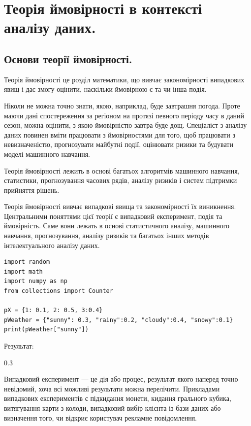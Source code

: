 \chapter{Теорія ймовірності в контексті аналізу даних.}


\section{Основи теорії ймовірності.}

Теорія ймовірності це розділ математики, що вивчає закономірності випадкових явищ і дає змогу оцінити, наскільки ймовірною є та чи інша подія. 

Ніколи не можна точно знати, якою, наприклад, буде завтрашня погода. Проте маючи дані спостереження за регіоном на протязі певного періоду часу в даний сезон, можна оцінити, з якою ймовірністю завтра буде дощ. Спеціаліст з аналізу даних повинен вміти працювати з ймовірностями для того, щоб працювати з невизначеністю, прогнозувати майбутні події, оцінювати ризики та будувати моделі машинного навчання.

Теорія ймовірності лежить в основі багатьох алгоритмів машинного навчання, статистики, прогнозування часових рядів, аналізу ризиків і систем підтримки прийняття рішень.

Теорія ймовірності вивчає випадкові явища та закономірності їх виникнення. Центральними поняттями цієї теорії є випадковий експеримент, подія та ймовірність. Саме вони лежать в основі статистичного аналізу, машинного навчання, прогнозування, аналізу ризиків та багатьох інших методів інтелектуального аналізу даних.

\begin{lstlisting}
import random
import math
import numpy as np
from collections import Counter

pX = {1: 0.1, 2: 0.5, 3:0.4}
pWeather = {"sunny": 0.3, "rainy":0.2, "cloudy":0.4, "snowy":0.1}
print(pWeather["sunny"])
\end{lstlisting}

Результат:

\begin{console}
0.3
\end{console}

Випадковий експеримент — це дія або процес, результат якого наперед точно невідомий, хоча всі можливі результати можна перелічити. Прикладами випадкових експериментів є підкидання монети, кидання грального кубика, витягування карти з колоди, випадковий вибір клієнта із бази даних або визначення того, чи відкриє користувач рекламне повідомлення.

